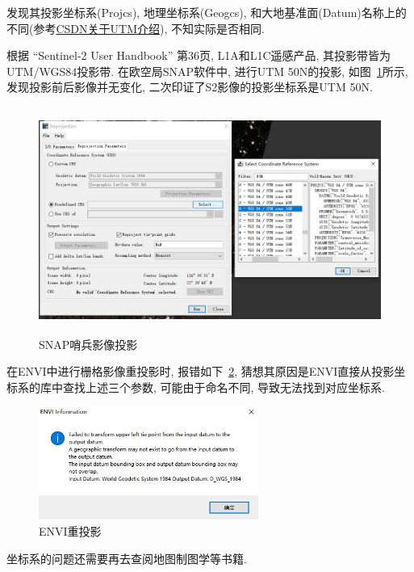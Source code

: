 发现其投影坐标系(Projcs), 地理坐标系(Geogcs), 和大地基准面(Datum)名称上的不同(参考\href{https://blog.csdn.net/ivan_ljf/article/details/52637293}{CSDN关于UTM介绍}), 不知实际是否相同.

根据 ``Sentinel-2 User Handbook'' 第36页, L1A和L1C遥感产品, 其投影带皆为UTM/WGS84投影带. 在欧空局SNAP软件中, 进行UTM 50N的投影, 如图~\ref{fig:0216}所示, 发现投影前后影像并无变化, 二次印证了S2影像的投影坐标系是UTM 50N.

\begin{figure}[!htbp]
    \centering
    \includegraphics[height=20em]{pic/q0404.jpg}
    \caption{SNAP哨兵影像投影}
    \label{fig:0216}
\end{figure}

在ENVI中进行栅格影像重投影时, 报错如下~\ref{fig:0217}, 猜想其原因是ENVI直接从投影坐标系的库中查找上述三个参数, 可能由于命名不同, 导致无法找到对应坐标系.

\begin{figure}[!htbp]
    \centering
    \includegraphics[height=10em]{pic/q0402.jpg}
    \caption{ENVI重投影}
    \label{fig:0217}
\end{figure}

坐标系的问题还需要再去查阅地图制图学等书籍.


